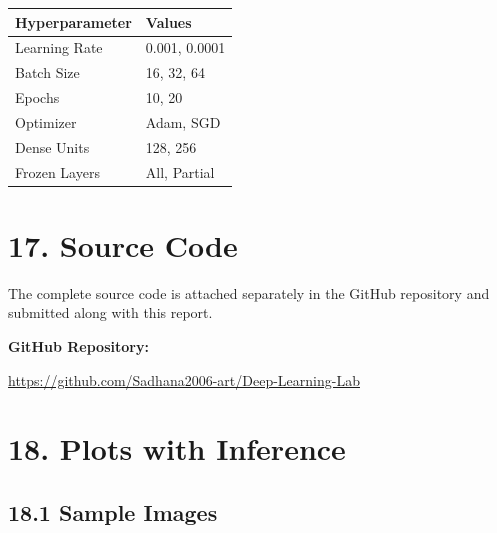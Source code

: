 \documentclass[11pt]{article}
\begin{document}
\begin{center}

\begin{tabular}{|l|l|}

\hline

Hyperparameter & Values\\

\hline

Learning Rate &
0.001, 0.0001\\

\hline

Batch Size &
16, 32, 64\\

\hline

Epochs &
10, 20\\

\hline

Optimizer &
Adam, SGD\\

\hline

Dense Units &
128, 256\\

\hline

Frozen Layers &
All, Partial\\

\hline

\end{tabular}

\end{center}

\section*{17. Source Code}

The complete source code is attached separately in the GitHub repository and submitted along with this report.

\textbf{GitHub Repository:}

\url{https://github.com/Sadhana2006-art/Deep-Learning-Lab}

\setcounter{figure}{0}

\section*{18. Plots with Inference}

\subsection*{18.1 Sample Images}
\end{document}
